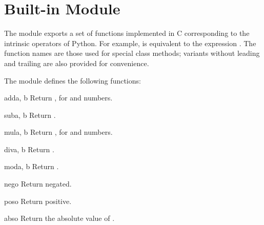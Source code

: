 
\section{Built-in Module }
\label{module-operator}

The  module exports a set of functions implemented in C
corresponding to the intrinsic operators of Python.  For example,
 is equivalent to the expression .  The
function names are those used for special class methods; variants without
leading and trailing \samp{__} are also provided for convenience.

The  module defines the following functions:

\begin{funcdesc}{add}{a, b}
Return  \code{+} , for  and  numbers.
\end{funcdesc}

\begin{funcdesc}{sub}{a, b}
Return  \code{-} .
\end{funcdesc}

\begin{funcdesc}{mul}{a, b}
Return  \code{*} , for  and  numbers.
\end{funcdesc}

\begin{funcdesc}{div}{a, b}
Return  \code{/} .
\end{funcdesc}

\begin{funcdesc}{mod}{a, b}
Return  \code{\%} .
\end{funcdesc}

\begin{funcdesc}{neg}{o}
Return  negated.
\end{funcdesc}

\begin{funcdesc}{pos}{o}
Return  positive.
\end{funcdesc}

\begin{funcdesc}{abs}{o}
Return the absolute value of .
\end{funcdesc}

